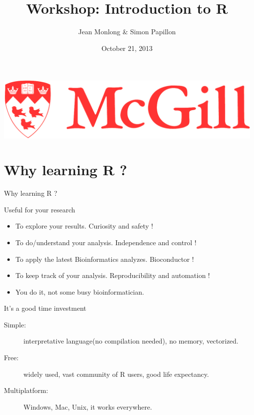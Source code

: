 \documentclass[10pt]{beamer}
\title{Workshop: Introduction to R}
\author{Jean Monlong \& Simon Papillon}
\institute{Human Genetics department}
\date{October 21, 2013}
\begin{document}
\begin{frame}
  \titlepage
  \centering
  \includegraphics[page=1,height=.1\textheight]{imgs/McGill-Logo1.png}

\end{frame}

\section{Why learning R ?}

\begin{frame}{Why learning R ?}
\begin{block}{Useful for your research}
  \begin{itemize}
  \item To explore your results. Curiosity and safety !
  \item To do/understand your analysis. Independence and control !
  \item To apply the latest Bioinformatics analyzes. Bioconductor !
  \item To keep track of your analysis. Reproducibility and automation !
    \bigskip
  \item You do it, not some busy bioinformatician. 
  \end{itemize}
\end{block}
\begin{block}{It's a good time investment}
  \begin{description}
  \item[Simple:] interpretative language(no compilation needed), no memory, vectorized.
  \item[Free:] widely used, vast community of R users, good life expectancy.
  \item[Multiplatform:] Windows, Mac, Unix, it works everywhere.
  \end{description}
\end{block}
\end{frame}
\end{document}
